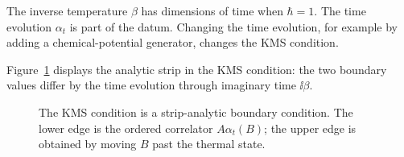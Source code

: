 The inverse temperature \(\beta\) has dimensions of time when \(\hbar=1\).
The time evolution \(\alpha_t\) is part of the datum.  Changing the time
evolution, for example by adding a chemical-potential generator, changes the
KMS condition.

Figure~\ref{fig:kms-strip} displays the analytic strip in the KMS condition:
the two boundary values differ by the time evolution through imaginary time
\(\ii\beta\).

\begin{figure}[H]
\centering
{}
\caption{The KMS condition is a strip-analytic boundary condition.  The lower
edge is the ordered correlator \(A\alpha_t(B)\); the upper edge is obtained by
moving \(B\) past the thermal state.}
\label{fig:kms-strip}
\end{figure}

